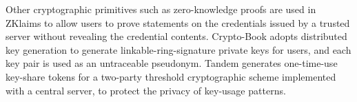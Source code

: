 \begin{comment}
However, \usso\ explores this cryptographic technique in greater depth, resulting in an additional privacy property that is not considered or supported in existing anonymous tokens \cite{privacypass,trusttoken}. %
The exponent $k$ in PrivacyPass/TrustToken is held only by the server as a consistent private key, and the random number $e$ is only known to a user. In contrast, the scalar $u$ in \usso\ denotes a user identity known to the user and the IdP, and the random number $t$ is an ephemeral trapdoor shared between the user and the RP.
The sharing of random numbers enables the derivation of permanent accounts in \usso,
 while we prove the additional unlinkability across colluding RPs by showing that their knowledge about any two users $u$ and $u'$, i.e., ($ID_{RP}, t, [u]ID_{RP}$) and ($ID_{RP'}, t', [u']ID_{RP'}$), obtained from different logins, is indistinguishable.



\end{comment}

\oldc
Other cryptographic primitives such as zero-knowledge proofs are used in ZKlaims \cite{zklaim} to allow users to prove statements on the credentials issued by a trusted server without revealing the credential contents. Crypto-Book \cite{crypto-book} adopts distributed key generation to generate linkable-ring-signature private keys for users, and each key pair is used as an untraceable pseudonym. Tandem \cite{tandem} generates one-time-use key-share tokens for a two-party threshold cryptographic scheme implemented with a central server, to protect the privacy of key-usage patterns.


